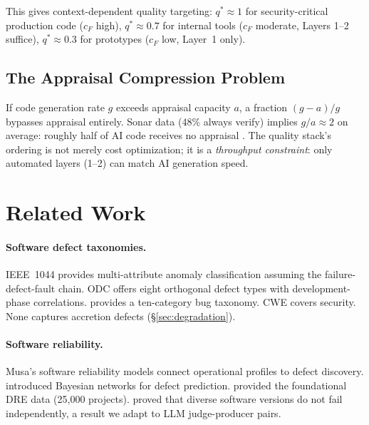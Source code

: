 \documentclass[11pt, a4paper, copyright]{googledeepmind}
\begin{document}
This gives context-dependent quality targeting: $q^* \approx 1$ for security-critical production code ($c_F$ high), $q^* \approx 0.7$ for internal tools ($c_F$ moderate, Layers 1--2 suffice), $q^* \approx 0.3$ for prototypes ($c_F$ low, Layer~1 only).

\subsection{The Appraisal Compression Problem}

If code generation rate $g$ exceeds appraisal capacity $a$, a fraction $(g-a)/g$ bypasses appraisal entirely. Sonar data (48\% always verify) implies $g/a \approx 2$ on average: roughly half of AI code receives no appraisal \citep{sonar2026}. The quality stack's ordering is not merely cost optimization; it is a \emph{throughput constraint}: only automated layers (1--2) can match AI generation speed.


\section{Related Work}
\label{sec:related}

\paragraph{Software defect taxonomies.} IEEE~1044 \citep{ieee1044} provides multi-attribute anomaly classification assuming the failure-defect-fault chain. ODC \citep{chillarege1992} offers eight orthogonal defect types with development-phase correlations. \citet{beizer1990} provides a ten-category bug taxonomy. CWE covers security. None captures accretion defects (\S\ref{sec:degradation}).

\paragraph{Software reliability.} Musa's software reliability models \citep{musa1987} connect operational profiles to defect discovery. \citet{fenton1999} introduced Bayesian networks for defect prediction. \citet{capersjones2012} provided the foundational DRE data (25,000 projects). \citet{littlewood1993, littlewood2000} proved that diverse software versions do not fail independently, a result we adapt to LLM judge-producer pairs.
\end{document}
